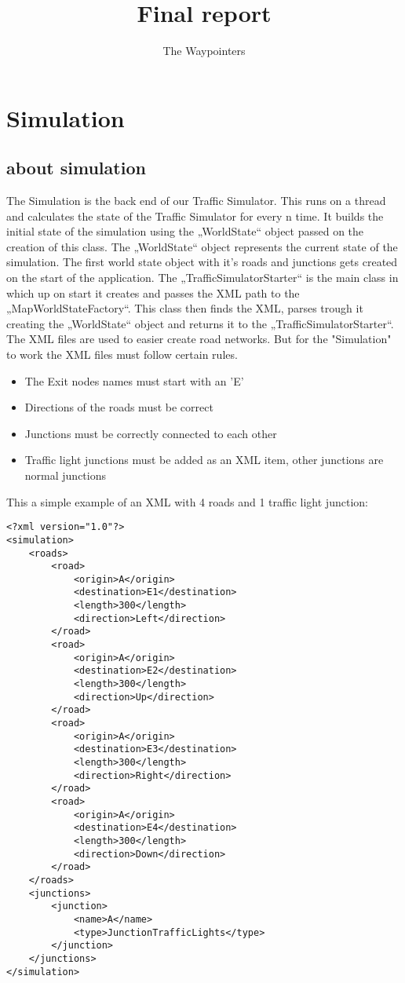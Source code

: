 \documentclass[a4paper,12pt]{article}
\title{Final report}
\author{The Waypointers}
\begin{document}
\section{Simulation}

\subsection{about simulation}
The Simulation is the back end of our Traffic Simulator. This runs on a thread and calculates the state of the Traffic Simulator for every n time. It builds the initial state of the simulation using the „WorldState“ object passed on the creation of this class. 
\newline
The „WorldState“ object represents the current state of the simulation. The first world state object with it's roads and junctions gets created on the start of the application. The „TrafficSimulatorStarter“ is the main class in which up on start it creates and passes the XML path to the „MapWorldStateFactory“.
This class then finds the XML, parses trough it creating the „WorldState“ object and returns it to the „TrafficSimulatorStarter“.
\newline
The XML files are used to easier create road networks. But for the "Simulation" to work the XML files must follow certain rules.
\begin{itemize}
	\item The Exit nodes names must start with an 'E'
	\item Directions of the roads must be correct
	\item Junctions must be correctly connected to each other
	\item Traffic light junctions must be added as an XML item, other junctions are normal junctions
\end{itemize}
This a simple example of an XML with 4 roads and 1 traffic light junction:
\begin{lstlisting}
<?xml version="1.0"?>
<simulation>
	<roads>
		<road>
			<origin>A</origin>
			<destination>E1</destination>
			<length>300</length>
			<direction>Left</direction>
		</road>
		<road>
			<origin>A</origin>
			<destination>E2</destination>
			<length>300</length>
			<direction>Up</direction>
		</road>
		<road>
			<origin>A</origin>
			<destination>E3</destination>
			<length>300</length>
			<direction>Right</direction>
		</road>
		<road>
			<origin>A</origin>
			<destination>E4</destination>
			<length>300</length>
			<direction>Down</direction>
		</road>
	</roads>
	<junctions>
		<junction>
			<name>A</name>
			<type>JunctionTrafficLights</type>
		</junction>
	</junctions>
</simulation>
\end{lstlisting}
\end{document}
